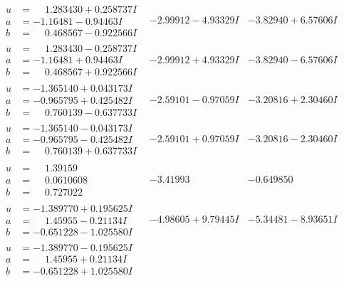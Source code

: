 \documentclass[1p]{elsarticle_modified}
\theoremstyle{definition}
\begin{document}
$$\begin{array}{c|c|c}
\begin{aligned}
u &= \phantom{-}1.283430 + 0.258737 I \\
a &= -1.16481 - 0.94463 I \\
b &= \phantom{-}0.468567 - 0.922566 I\end{aligned}
 & -2.99912 - 4.93329 I & -3.82940 + 6.57606 I \\ \hline\begin{aligned}
u &= \phantom{-}1.283430 - 0.258737 I \\
a &= -1.16481 + 0.94463 I \\
b &= \phantom{-}0.468567 + 0.922566 I\end{aligned}
 & -2.99912 + 4.93329 I & -3.82940 - 6.57606 I \\ \hline\begin{aligned}
u &= -1.365140 + 0.043173 I \\
a &= -0.965795 + 0.425482 I \\
b &= \phantom{-}0.760139 - 0.637733 I\end{aligned}
 & -2.59101 - 0.97059 I & -3.20816 + 2.30460 I \\ \hline\begin{aligned}
u &= -1.365140 - 0.043173 I \\
a &= -0.965795 - 0.425482 I \\
b &= \phantom{-}0.760139 + 0.637733 I\end{aligned}
 & -2.59101 + 0.97059 I & -3.20816 - 2.30460 I \\ \hline\begin{aligned}
u &= \phantom{-}1.39159\phantom{ +0.000000I} \\
a &= \phantom{-}0.0610608\phantom{ +0.000000I} \\
b &= \phantom{-}0.727022\phantom{ +0.000000I}\end{aligned}
 & -3.41993\phantom{ +0.000000I} & -0.649850\phantom{ +0.000000I} \\ \hline\begin{aligned}
u &= -1.389770 + 0.195625 I \\
a &= \phantom{-}1.45955 - 0.21134 I \\
b &= -0.651228 - 1.025580 I\end{aligned}
 & -4.98605 + 9.79445 I & -5.34481 - 8.93651 I \\ \hline\begin{aligned}
u &= -1.389770 - 0.195625 I \\
a &= \phantom{-}1.45955 + 0.21134 I \\
b &= -0.651228 + 1.025580 I\end{aligned}

\end{array}$$
\end{document}
